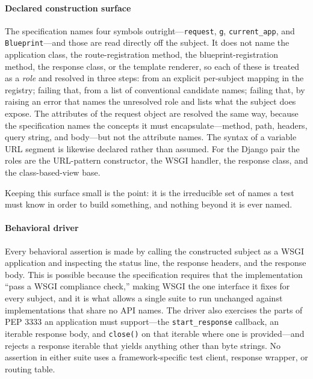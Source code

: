 \paragraph{Declared construction surface}
The specification names four symbols outright---\texttt{request},
\texttt{g}, \texttt{current\_app}, and \texttt{Blueprint}---and those
are read directly off the subject. It does not name the application
class, the route-registration method, the blueprint-registration
method, the response class, or the template renderer, so each of these
is treated as a \emph{role} and resolved in three steps: from an
explicit per-subject mapping in the registry; failing that, from a list
of conventional candidate names; failing that, by raising an error that
names the unresolved role and lists what the subject does expose. The
attributes of the request object are resolved the same way, because the
specification names the concepts it must encapsulate---method, path,
headers, query string, and body---but not the attribute names. The
syntax of a variable URL segment is likewise declared rather than
assumed. For the Django pair the roles are the URL-pattern constructor,
the WSGI handler, the response class, and the class-based-view base.

Keeping this surface small is the point: it is the irreducible set of
names a test must know in order to build something, and nothing beyond
it is ever named.

\paragraph{Behavioral driver}
Every behavioral assertion is made by calling the constructed subject
as a WSGI application and inspecting the status line, the response
headers, and the response body. This is possible because the
specification requires that the implementation ``pass a WSGI compliance
check,'' making WSGI the one interface it fixes for every subject, and
it is what allows a single suite to run unchanged against
implementations that share no API names. The driver also exercises the
parts of PEP 3333 an application must support---the
\texttt{start\_response} callback, an iterable response body, and
\texttt{close()} on that iterable where one is provided---and rejects a
response iterable that yields anything other than byte strings. No
assertion in either suite uses a framework-specific test client,
response wrapper, or routing table.

